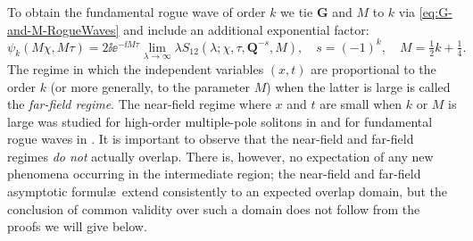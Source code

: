 To obtain the fundamental rogue wave of order $k$ we tie $\mathbf{G}$ and $M$ to $k$ via \eqref{eq:G-and-M-RogueWaves} and include an additional exponential factor:
\begin{equation}
\psi_k(M\chi,M\tau)=2\ii\ee^{-\ii M\tau}\lim_{\lambda\to\infty}\lambda S_{12}(\lambda;\chi,\tau,\mathbf{Q}^{-s},M),\quad s=(-1)^k,\quad M=\tfrac{1}{2}k+\tfrac{1}{4}.
\label{eq:psi-k-S}
\end{equation}
The regime in which the independent variables $(x,t)$ are proportional to the order $k$ (or more generally, to the parameter $M$) when the latter is large is called the \emph{far-field regime}.  The near-field regime where $x$ and $t$ are small when $k$ or $M$ is large was studied for high-order multiple-pole solitons in \cite{BilmanB19} and for fundamental rogue waves in \cite{BilmanLM20}.  It is important to observe that the near-field and far-field regimes \emph{do not} actually overlap.  There is, however, no expectation of any new phenomena occurring in the intermediate region; the near-field and far-field asymptotic formul\ae\ extend consistently to an expected overlap domain, but the conclusion of common validity over such a domain does not follow from the proofs we will give below.

